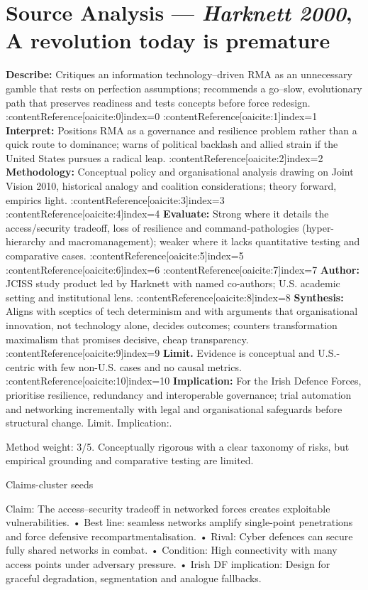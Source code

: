 \section*{Source Analysis — \textit{Harknett 2000}, A revolution today is premature}
\textbf{Describe:} Critiques an information technology--driven RMA as an unnecessary gamble that rests on perfection assumptions; recommends a go--slow, evolutionary path that preserves readiness and tests concepts before force redesign. {\small :contentReference[oaicite:0]{index=0} :contentReference[oaicite:1]{index=1}}
\textbf{Interpret:} Positions RMA as a governance and resilience problem rather than a quick route to dominance; warns of political backlash and allied strain if the United States pursues a radical leap. {\small :contentReference[oaicite:2]{index=2}}
\textbf{Methodology:} Conceptual policy and organisational analysis drawing on Joint Vision 2010, historical analogy and coalition considerations; theory forward, empirics light. {\small :contentReference[oaicite:3]{index=3} :contentReference[oaicite:4]{index=4}}
\textbf{Evaluate:} Strong where it details the access/security tradeoff, loss of resilience and command-pathologies (hyper-hierarchy and macromanagement); weaker where it lacks quantitative testing and comparative cases. {\small :contentReference[oaicite:5]{index=5} :contentReference[oaicite:6]{index=6} :contentReference[oaicite:7]{index=7}}
\textbf{Author:} JCISS study product led by Harknett with named co-authors; U.S. academic setting and institutional lens. {\small :contentReference[oaicite:8]{index=8}}
\textbf{Synthesis:} Aligns with sceptics of tech determinism and with arguments that organisational innovation, not technology alone, decides outcomes; counters transformation maximalism that promises decisive, cheap transparency. {\small :contentReference[oaicite:9]{index=9}}
\textbf{Limit.} Evidence is conceptual and U.S.-centric with few non-U.S. cases and no causal metrics. {\small :contentReference[oaicite:10]{index=10}}
\textbf{Implication:} For the Irish Defence Forces, prioritise resilience, redundancy and interoperable governance; trial automation and networking incrementally with legal and organisational safeguards before structural change. Limit. Implication:.

Method weight: 3/5. Conceptually rigorous with a clear taxonomy of risks, but empirical grounding and comparative testing are limited.

Claims-cluster seeds

Claim: The access–security tradeoff in networked forces creates exploitable vulnerabilities.
• Best line: seamless networks amplify single-point penetrations and force defensive recompartmentalisation. {\small }
• Rival: Cyber defences can secure fully shared networks in combat.
• Condition: High connectivity with many access points under adversary pressure.
• Irish DF implication: Design for graceful degradation, segmentation and analogue fallbacks.

